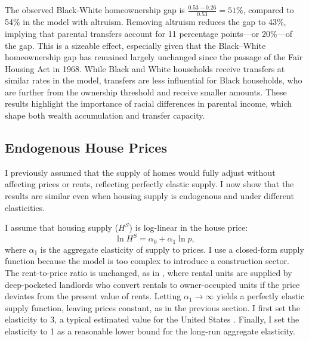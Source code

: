 \documentclass[12pt]{article}
\begin{document}
The observed Black-White homeownership gap is $\frac{0.53 - 0.26}{0.53} = 51\%$, compared to 54\% in the model with altruism. Removing altruism reduces the gap to 43\%, implying that parental transfers account for 11 percentage points---or 20\%---of the gap. This is a sizeable effect, especially given that the Black–White homeownership gap has remained largely unchanged since the passage of the Fair Housing Act in 1968. While Black and White households receive transfers at similar rates in the model, transfers are less influential for Black households, who are further from the ownership threshold and receive smaller amounts. These results highlight the importance of racial differences in parental income, which shape both wealth accumulation and transfer capacity. 

\subsection{Endogenous House Prices}\label{sec:endoprice}
I previously assumed that the supply of homes would fully adjust without affecting prices or rents, reflecting perfectly elastic supply. I now show that the results are similar even when housing supply is endogenous and under different elasticities.

I assume that housing supply ($H^S$) is log-linear in the house price:
\begin{equation}
\label{eq:hsupply}
\ln H^S = \alpha_0 + \alpha_1 \ln p,
\end{equation}
where $\alpha_1$ is the aggregate elasticity of supply to prices. I use a closed-form supply function because the model is too complex to introduce a construction sector. The rent-to-price ratio is unchanged, as in \cite{Kaplan2020}, where rental units are supplied by deep-pocketed landlords who convert rentals to owner-occupied units if the price deviates from the present value of rents. Letting $\alpha_1\to\infty$ yields a perfectly elastic supply function, leaving prices constant, as in the previous section. I first set the elasticity to 3, a typical estimated value for the United States \cite[see e.g.,][]{saiz2010geographic,aastveit2023changing}. Finally, I set the elasticity to 1 as a reasonable lower bound for the long-run aggregate elasticity.
\end{document}
